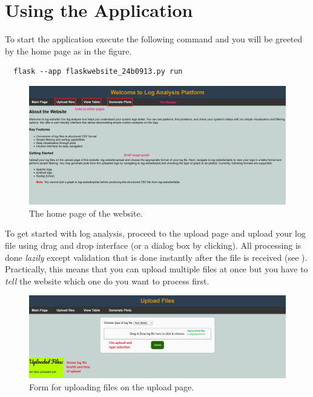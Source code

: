 \documentclass[11pt]{scrartcl}
\begin{document}
\section{Using the Application}

To start the application execute the following command
and you will be greeted by the home page as in the figure.

\begin{verbatim}
  flask --app flaskwebsite_24b0913.py run
\end{verbatim}


\begin{figure}[htbp]
  
  \centering
  \includegraphics[width=\linewidth]{images/homepage.png}
  \caption{The home page of the website.}
  \label{homepage}

\end{figure}

To get started with log analysis, proceed to the upload page and upload your log
file using drag and drop interface (or a dialog box by clicking). All processing
is done \emph{lazily} except validation that is done instantly after the file is
received (see ). Practically, this means that you can upload
multiple files at once but you have to \emph{tell} the website which one do you
want to process first.



\begin{figure}[htbp]
  
  \centering
  \includegraphics[width=\linewidth]{images/uploadpage.png}
  \caption{Form for uploading files on the upload page.}
  \label{uploadpage}

\end{figure}
\end{document}
